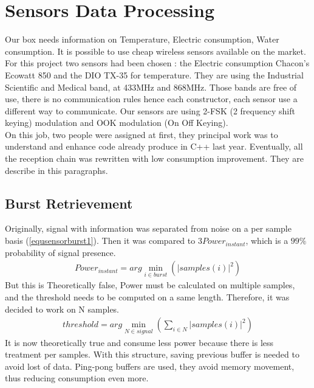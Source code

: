 %
%
\section{Sensors Data Processing}
Our box needs information on Temperature, Electric consumption, Water consumption. It is possible to use cheap wireless sensors available on the market. For this project two sensors had been chosen : the Electric consumption Chacon's Ecowatt 850 and the DIO TX-35 for temperature. They are using the Industrial Scientific and Medical band, at 433MHz and 868MHz. Those bands are free of use, there is no communication rules hence each constructor, each sensor use a different way to communicate. Our sensors are using 2-FSK (2 frequency shift keying) modulation and OOK modulation (On Off Keying). \\
On this job, two people were assigned at first, they principal work was to understand and enhance code already produce in \textsc{C++} last year. Eventually, all the reception chain was rewritten with low consumption improvement. They are describe in this paragraphs.
\subsection{Burst Retrievement}
Originally, signal with information was separated from noise on a per sample basis (\ref{equsensorburst1}). Then it was compared to $3Power_{instant}$, which is a $99\%$ probability of signal presence.
\vspace{-7pt}
\begin{align} \label{equsensorburst1}
Power_{instant} = arg\min_{i\in burst}(|samples(i)|^2)
\end{align}
But this is Theoretically false, Power must be calculated on multiple samples, and the threshold needs to be computed on a same length. Therefore, it was decided to work on N samples.
\begin{align} \label{equsensorburst2}
threshold = arg\min_{N \in signal}\left(\sum_{i\in N}|samples(i)|^2\right)
\end{align}
It is now theoretically true and consume less power because there is less treatment per samples. With this structure, saving previous buffer is needed to avoid lost of data. Ping-pong buffers are used, they avoid memory movement, thus reducing consumption even more.
